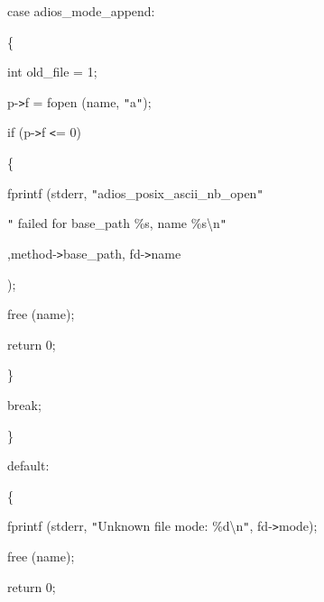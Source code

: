 \vspace{10pt}
case adios\_mode\_append:

\vspace{10pt}
\parindent=57pt
\{

\vspace{10pt}
\parindent=43pt
int old\_file = 1;

\vspace{10pt}
p-\texttt{>}f = fopen (name, \texttt{"}a\texttt{"});

\vspace{10pt}
\parindent=86pt
if (p-\texttt{>}f \texttt{<}= 0)

\vspace{10pt}
\parindent=43pt
\{

\vspace{10pt}
\parindent=57pt
fprintf (stderr, \texttt{"}adios\_posix\_ascii\_nb\_open\texttt{"}

\vspace{10pt}
\parindent=118pt
\texttt{"} failed for base\_path \%s, name \%s\textbackslash{}n\texttt{"}

\vspace{10pt}
\parindent=86pt
,method-\texttt{>}base\_path, fd-\texttt{>}name

\vspace{10pt}
);

\vspace{10pt}
\parindent=144pt
free (name);

\vspace{10pt}
\parindent=57pt
return 0;

\vspace{10pt}
\parindent=43pt
\}

\vspace{10pt}
break;

\vspace{10pt}
\parindent=72pt
\}

\vspace{10pt}
\parindent=28pt
default:

\vspace{10pt}
\{

\vspace{10pt}
\parindent=72pt
fprintf (stderr, \texttt{"}Unknown file mode: \%d\textbackslash{}n\texttt{"}, fd-\texttt{>}mode);

\vspace{10pt}
\parindent=43pt
free (name);

\vspace{10pt}
return 0;

